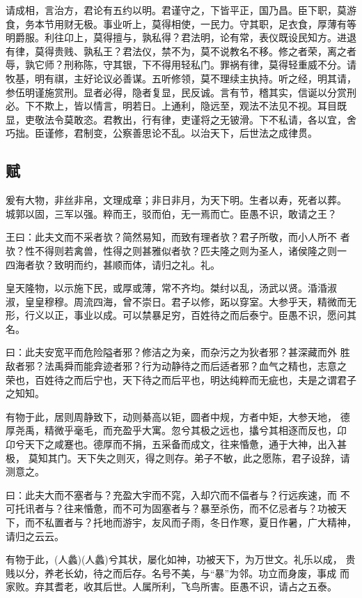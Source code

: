 \documentclass[]{article}
\begin{document}
请成相，言治方，君论有五约以明。君谨守之，下皆平正，国乃昌。臣下职，莫游食，务本节用财无极。事业听上，莫得相使，一民力。守其职，足衣食，厚薄有等明爵服。利往卬上，莫得擅与，孰私得？君法明，论有常，表仪既设民知方。进退有律，莫得贵贱、孰私王？君法仪，禁不为，莫不说教名不移。修之者荣，离之者辱，孰它师？刑称陈，守其银，下不得用轻私门。罪祸有律，莫得轻重威不分。请牧基，明有祺，主好论议必善谋。五听修领，莫不理续主执持。听之经，明其请，参伍明谨施赏刑。显者必得，隐者复显，民反诚。言有节，稽其实，信诞以分赏刑必。下不欺上，皆以情言，明若日。上通利，隐远至，观法不法见不视。耳目既显，吏敬法令莫敢恣。君教出，行有律，吏谨将之无铍滑。下不私请，各以宜，舍巧拙。臣谨修，君制变，公察善思论不乱。以治天下，后世法之成律贯。

\hypertarget{header-n112}{%
\subsection{赋}\label{header-n112}}

爰有大物，非丝非帛，文理成章；非日非月，为天下明。生者以寿，死者以葬。
城郭以固，三军以强。粹而王，驳而伯，无一焉而亡。臣愚不识，敢请之王？

王曰：此夫文而不采者欤？简然易知，而致有理者欤？君子所敬，而小人所不
者欤？性不得则若禽兽，性得之则甚雅似者欤？匹夫隆之则为圣人，诸侯隆之则一
四海者欤？致明而约，甚顺而体，请归之礼。礼。

皇天隆物，以示施下民，或厚或薄，常不齐均。桀纣以乱，汤武以贤。涽涽淑
淑，皇皇穆穆。周流四海，曾不崇日。君子以修，跖以穿室。大参乎天，精微而无
形，行义以正，事业以成。可以禁暴足穷，百姓待之而后泰宁。臣愚不识，愿问其
名。

曰：此夫安宽平而危险隘者邪？修洁之为亲，而杂污之为狄者邪？甚深藏而外
胜敌者邪？法禹舜而能弇迹者邪？行为动静待之而后适者邪？血气之精也，志意之
荣也，百姓待之而后宁也，天下待之而后平也，明达纯粹而无疵也，夫是之谓君子
之知知。

有物于此，居则周静致下，动则綦高以钜，圆者中规，方者中矩，大参天地，
德厚尧禹，精微乎毫毛，而充盈乎大寓。忽兮其极之远也，攭兮其相逐而反也，卬
卬兮天下之咸蹇也。德厚而不捐，五采备而成文，往来惛惫，通于大神，出入甚极，
莫知其门。天下失之则灭，得之则存。弟子不敏，此之愿陈，君子设辞，请测意之。

曰：此夫大而不塞者与？充盈大宇而不窕，入却穴而不偪者与？行远疾速，而
不可托讯者与？往来惛惫，而不可为固塞者与？暴至杀伤，而不亿忌者与？功被天
下，而不私置者与？托地而游宇，友风而子雨，冬日作寒，夏日作暑，广大精神，
请归之云云。

有物于此，(人蠡)(人蠡)兮其状，屡化如神，功被天下，为万世文。礼乐以成，
贵贱以分，养老长幼，待之而后存。名号不美，与``暴''为邻。功立而身废，事成
而家败。弃其耆老，收其后世。人属所利，飞鸟所害。臣愚不识，请占之五泰。
\end{document}
